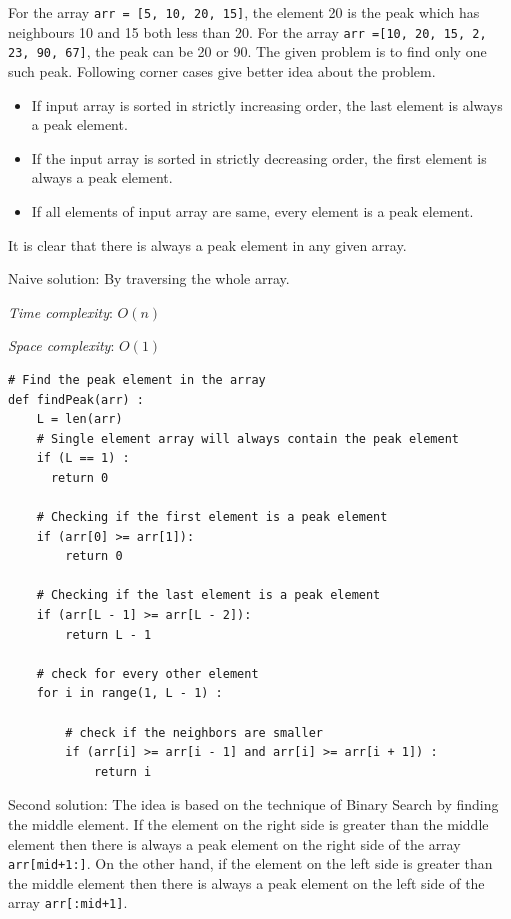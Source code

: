 \documentclass[a4paper,11pt]{book}
\begin{document}
\noindent For the array \lstinline{arr = [5, 10, 20, 15]}, the element 20 is the peak which has neighbours 10 and 15 both less than 20. For the array \lstinline{arr =[10, 20, 15, 2, 23, 90, 67]}, the peak can be 20 or 90. The given problem is to find only one such peak. Following corner cases give better idea about the problem. 

\begin{itemize}
    \item If input array is sorted in strictly increasing order, the last element is always a peak element.
    \item If the input array is sorted in strictly decreasing order, the first element is always a peak element.
    \item If all elements of input array are same, every element is a peak element.
\end{itemize}
It is clear that there is always a peak element in any given array.

\vspace{3mm}

\noindent Naive solution: By traversing the whole array.

\noindent \textit{Time complexity}: $O(n)$

\noindent \textit{Space complexity}: $O(1)$

\begin{lstlisting}
# Find the peak element in the array
def findPeak(arr) :
    L = len(arr)
    # Single element array will always contain the peak element
    if (L == 1) :
      return 0

    # Checking if the first element is a peak element
    if (arr[0] >= arr[1]):
        return 0

    # Checking if the last element is a peak element
    if (arr[L - 1] >= arr[L - 2]):
        return L - 1
  
    # check for every other element
    for i in range(1, L - 1) :
  
        # check if the neighbors are smaller
        if (arr[i] >= arr[i - 1] and arr[i] >= arr[i + 1]) :
            return i
\end{lstlisting}

\noindent Second solution: The idea is based on the technique of Binary Search by finding the middle element. If the element on the right side is greater than the middle element then there is always a peak element on the right side of the array \lstinline{arr[mid+1:]}. On the other hand, if the element on the left side is greater than the middle element then there is always a peak element on the left side of the array \lstinline{arr[:mid+1]}.
\vspace{3mm}
\end{document}

